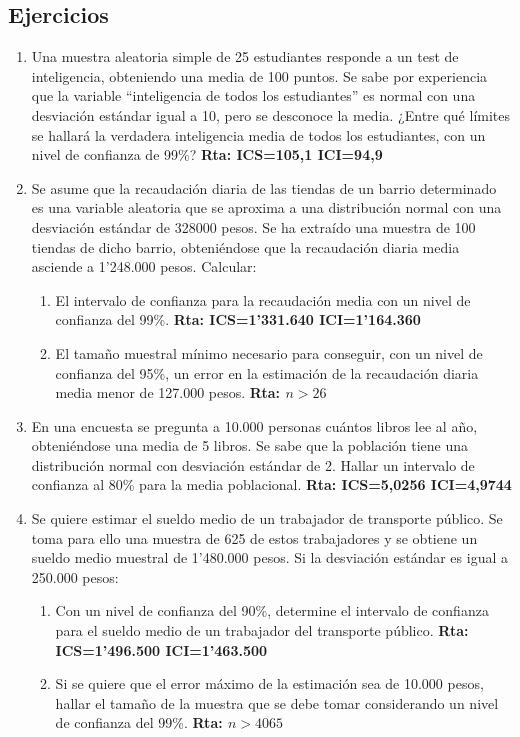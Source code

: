\documentclass[letterpaper]{article}
\begin{document}
\subsection{Ejercicios}
\begin{enumerate}
	\item Una muestra aleatoria simple de 25 estudiantes responde a un test de inteligencia, obteniendo una media de 100 puntos. Se sabe por experiencia que la variable “inteligencia de todos los estudiantes” es normal con una desviación estándar igual a 10, pero se desconoce la media. ¿Entre qué límites se hallará la verdadera inteligencia media de todos los estudiantes,
	con un nivel de confianza de 99\%? {\bf Rta: ICS=105,1 ICI=94,9}
	\item  Se asume que la recaudación diaria de las tiendas de un barrio determinado es una variable aleatoria que se aproxima a una distribución normal con una desviación estándar de 328000 pesos. Se ha extraído una muestra de 100 tiendas de dicho barrio, obteniéndose que la recaudación diaria media asciende a 1'248.000 pesos. Calcular:
	\begin{enumerate}
		\item El intervalo de confianza para la recaudación media con un nivel de confianza del 99\%. {\bf Rta: ICS=1'331.640 ICI=1'164.360}
		\item El tamaño muestral mínimo necesario para conseguir, con un nivel de confianza del 95\%, un error en la estimación de la recaudación diaria media menor de 127.000 pesos. {\bf Rta: $n > 26$}
	\end{enumerate}
	\item En una encuesta se pregunta a 10.000 personas cuántos libros lee al año, obteniéndose una media de 5 libros. Se sabe que la población tiene una distribución normal con desviación estándar de 2. Hallar un intervalo de confianza al 80\% para la media poblacional. {\bf Rta: ICS=5,0256 ICI=4,9744}
	\item Se quiere estimar el sueldo medio de un trabajador de transporte público. Se toma para ello una muestra de 625 de estos trabajadores y se obtiene un sueldo medio muestral de 1'480.000 pesos. Si la desviación estándar es igual a 250.000 pesos:
	\begin{enumerate}
		\item Con un nivel de confianza del 90\%, determine el intervalo de confianza para el sueldo medio de un trabajador del transporte público. {\bf Rta: ICS=1'496.500 ICI=1'463.500}
		\item Si se quiere que el error máximo de la estimación sea de 10.000 pesos, hallar el tamaño de la muestra que se debe tomar considerando un nivel de confianza del 99\%. {\bf Rta: $n > 4065$}
		

\end{enumerate}
\end{enumerate}
\end{document}
